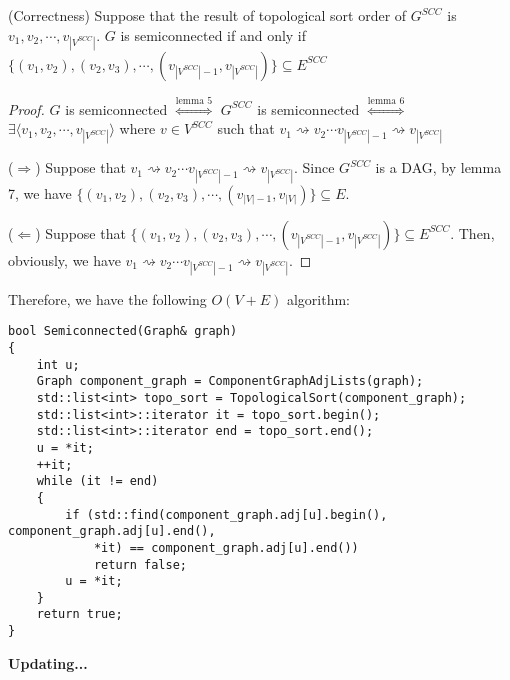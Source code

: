 \begin{theorem}{(Correctness)}
    Suppose that the result of topological sort order of $G^{SCC}$ is
    $v_1, v_2, \cdots, v_{|V^{SCC}|}$.
    $G$ is semiconnected if and only if 
    $\{ (v_1,v_2), (v_2,v_3), \cdots, (v_{|V^{SCC}|-1}, v_{|V^{SCC}|}) \} \subseteq E^{SCC}$
\end{theorem}

\begin{proof}
    $G$ is semiconnected
    $\overset{\text{lemma 5}}{\Longleftrightarrow}$
    $G^{SCC}$ is semiconnected
    $\overset{\text{lemma 6}}{\Longleftrightarrow}$\\
    $\exists \langle v_1, v_2, \cdots, v_{|V^{SCC}|} \rangle$ where $v \in V^{SCC}$ such that 
    $v_1 \rightsquigarrow v_2 \cdots v_{|V^{SCC}|-1} \rightsquigarrow v_{|V^{SCC}|}$

    ($\Longrightarrow$)
    Suppose that $v_1 \rightsquigarrow v_2 \cdots v_{|V^{SCC}|-1} \rightsquigarrow v_{|V^{SCC}|}$.
    Since $G^{SCC}$ is a DAG,
    by lemma 7, we have $\{ (v_1,v_2), (v_2,v_3), \cdots, (v_{|V|-1}, v_{|V|}) \} \subseteq E$.

    ($\Longleftarrow$)
    Suppose that $\{ (v_1,v_2), (v_2,v_3), \cdots, (v_{|V^{SCC}|-1}, v_{|V^{SCC}|}) \} \subseteq E^{SCC}$.
    Then, obviously, we have $v_1 \rightsquigarrow v_2 \cdots v_{|V^{SCC}|-1} \rightsquigarrow v_{|V^{SCC}|}$.
\end{proof}

Therefore, we have the following $O(V + E)$ algorithm:

\begin{verbatim}
bool Semiconnected(Graph& graph)
{
    int u;
    Graph component_graph = ComponentGraphAdjLists(graph);
    std::list<int> topo_sort = TopologicalSort(component_graph);
    std::list<int>::iterator it = topo_sort.begin();
    std::list<int>::iterator end = topo_sort.end();
    u = *it;
    ++it;
    while (it != end)
    {
        if (std::find(component_graph.adj[u].begin(), component_graph.adj[u].end(), 
            *it) == component_graph.adj[u].end())
            return false;
        u = *it;
    }
    return true;
}
\end{verbatim}

\centerline{\textbf{Updating...}}

